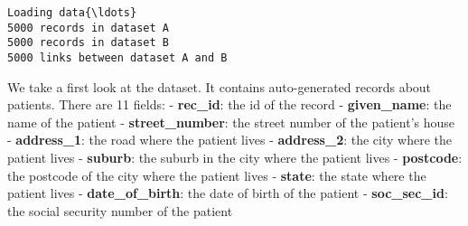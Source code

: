\documentclass{article}
\begin{document}
    \begin{Verbatim}[commandchars=\\\{\}]
Loading data{\ldots}
5000 records in dataset A
5000 records in dataset B
5000 links between dataset A and B

    \end{Verbatim}

    We take a first look at the dataset. It contains auto-generated records
about patients. There are 11 fields: - \textbf{rec\_id}: the id of the
record - \textbf{given\_name}: the name of the patient -
\textbf{street\_number}: the street number of the patient's house -
\textbf{address\_1}: the road where the patient lives -
\textbf{address\_2}: the city where the patient lives - \textbf{suburb}:
the suburb in the city where the patient lives - \textbf{postcode}: the
postcode of the city where the patient lives - \textbf{state}: the state
where the patient lives - \textbf{date\_of\_birth}: the date of birth of
the patient - \textbf{soc\_sec\_id}: the social security number of the
patient
\end{document}
